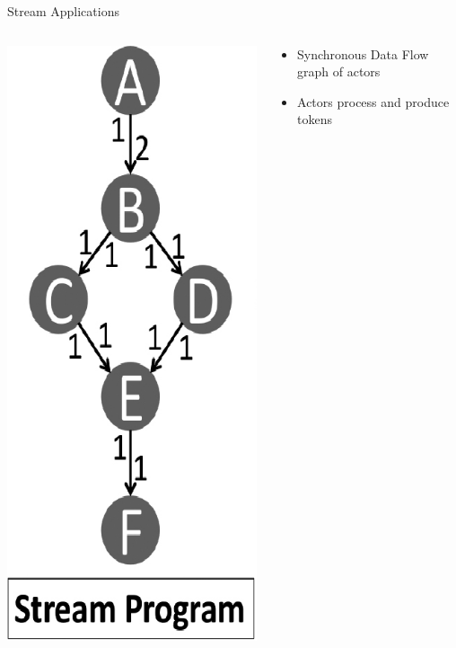 \documentclass{beamer}
\begin{document}
\begin{frame}{Stream Applications}
  \begin{columns}
    \begin{column}{0.4\textwidth}
      \begin{center}
        \includegraphics[height=0.85\textheight]{fig2_1}
      \end{center}
    \end{column}
    \begin{column}{0.6\textwidth}
      \begin{itemize}
        \item Synchronous Data Flow graph of \alert{actors}
        \item Actors process and produce \alert{tokens}
      \end{itemize}
    \end{column}
  \end{columns}
\end{frame}
\end{document}
